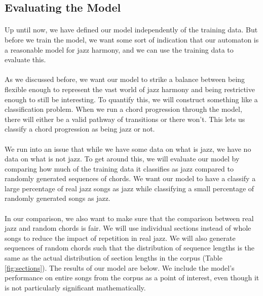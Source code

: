 \documentclass[]{article}
\begin{document}
\subsection{Evaluating the Model}
\label{sec:evaluating_model}
\paragraph{} Up until now, we have defined our model independently of the training data.  But before we train the model, we want some sort of indication that our automaton is a reasonable model for jazz harmony, and we can use the training data to evaluate this.

\paragraph{} As we discussed before, we want our model to strike a balance between being flexible enough to represent the vast world of jazz harmony and being restrictive enough to still be interesting.  To quantify this, we will construct something like a classification problem.  When we run a chord progression through the model, there will either be a valid pathway of transitions or there won't.  This lets us classify a chord progression as being jazz or not.

\paragraph{} We run into an issue that while we have some data on what is jazz, we have no data on what is not jazz.  To get around this, we will evaluate our model by comparing how much of the training data it classifies as jazz compared to randomly generated sequences of chords.  We want our model to have a classify a large percentage of real jazz songs as jazz while classifying a small percentage of randomly generated songs as jazz.

\paragraph{} In our comparison, we also want to make sure that the comparison between real jazz and random chords is fair.  We will use individual sections instead of whole songs to reduce the impact of repetition in real jazz.  We will also generate sequences of random chords such that the distribution of sequence lengths is the same as the actual distribution of section lengths in the corpus (Table \ref{fig:sections}).  The results of our model are below.  We include the model's performance on entire songs from the corpus as a point of interest, even though it is not particularly significant mathematically.
\end{document}
